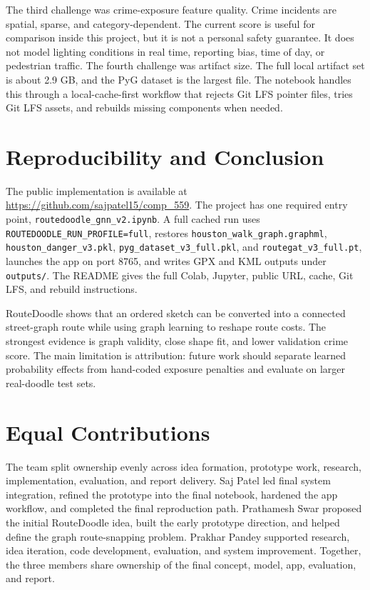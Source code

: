 \documentclass{article}
\begin{document}
The third challenge was crime-exposure feature quality. Crime incidents are spatial, sparse, and category-dependent. The current score is useful for comparison inside this project, but it is not a personal safety guarantee. It does not model lighting conditions in real time, reporting bias, time of day, or pedestrian traffic. The fourth challenge was artifact size. The full local artifact set is about 2.9 GB, and the PyG dataset is the largest file. The notebook handles this through a local-cache-first workflow that rejects Git LFS pointer files, tries Git LFS assets, and rebuilds missing components when needed.

\section{Reproducibility and Conclusion}

The public implementation is available at \url{https://github.com/sajpatel15/comp_559}. The project has one required entry point, \texttt{routedoodle\_gnn\_v2.ipynb}. A full cached run uses \texttt{ROUTEDOODLE\_RUN\_PROFILE=full}, restores \texttt{houston\_walk\_graph.graphml}, \texttt{houston\_danger\_v3.pkl}, \texttt{pyg\_dataset\_v3\_full.pkl}, and \texttt{routegat\_v3\_full.pt}, launches the app on port 8765, and writes GPX and KML outputs under \texttt{outputs/}. The README gives the full Colab, Jupyter, public URL, cache, Git LFS, and rebuild instructions.

RouteDoodle shows that an ordered sketch can be converted into a connected street-graph route while using graph learning to reshape route costs. The strongest evidence is graph validity, close shape fit, and lower validation crime score. The main limitation is attribution: future work should separate learned probability effects from hand-coded exposure penalties and evaluate on larger real-doodle test sets.

\FloatBarrier

\section{Equal Contributions}

The team split ownership evenly across idea formation, prototype work, research, implementation, evaluation, and report delivery. Saj Patel led final system integration, refined the prototype into the final notebook, hardened the app workflow, and completed the final reproduction path. Prathamesh Swar proposed the initial RouteDoodle idea, built the early prototype direction, and helped define the graph route-snapping problem. Prakhar Pandey supported research, idea iteration, code development, evaluation, and system improvement. Together, the three members share ownership of the final concept, model, app, evaluation, and report.
\end{document}
